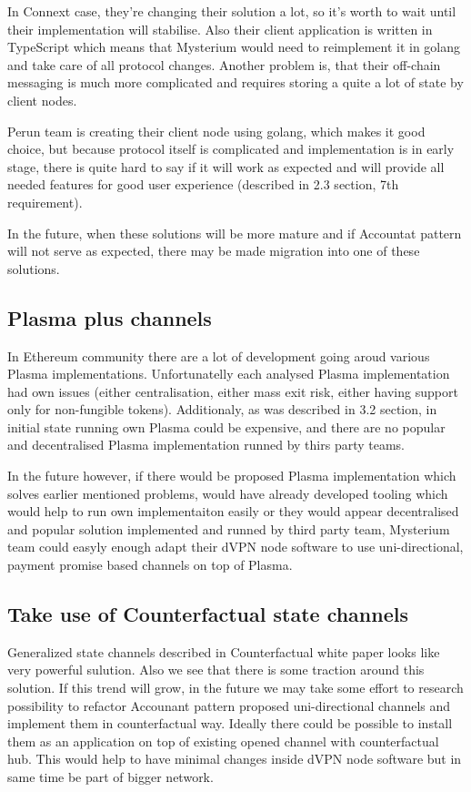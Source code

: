 \documentclass[a4paper,12pt]{article}
\begin{document}
In Connext case, they're changing their solution a lot, so it's worth to wait 
until their implementation will stabilise. Also their client application is 
written in TypeScript which means that Mysterium would need to reimplement it 
in golang and take care of all protocol changes. Another problem is, that their
off-chain messaging is much more complicated and requires storing a quite a lot
of state by client nodes.

Perun team is creating their client node using golang, which makes it good
choice, but because protocol itself is complicated and implementation is in 
early stage, there is quite hard to say if it will work as expected and will
provide all needed features for good user experience (described in 2.3 section, 
7th requirement).

In the future, when these solutions will be more mature and if Accountat pattern
will not serve as expected, there may be made migration into one of these 
solutions.

\subsection{Plasma plus channels}

In Ethereum community there are a lot of development going aroud various Plasma 
implementations. Unfortunatelly each analysed Plasma implementation had own 
issues (either centralisation, either mass exit risk, either having support only
for non-fungible tokens). Additionaly, as was described in 3.2 section, in 
initial state running own Plasma could be expensive, and there are no popular
and decentralised Plasma implementation runned by thirs party teams.

In the future however, if there would be proposed Plasma implementation which
solves earlier mentioned problems, would have already developed tooling which
would help to run own implementaiton easily or they would appear decentralised
and popular solution implemented and runned by third party team, Mysterium team 
could easyly enough adapt their dVPN node software to use uni-directional, 
payment promise based channels on top of Plasma.

\subsection{Take use of Counterfactual state channels}

Generalized state channels described in Counterfactual \cite{counterfactual} 
white paper looks like very powerful sulution. Also we see that there is some
traction around this solution. If this trend will grow, in the future we may
take some effort to research possibility to refactor Accounant pattern proposed 
uni-directional channels and implement them in counterfactual way. Ideally there
could be possible to install them as an application on top of existing opened 
channel with counterfactual hub. This would help to have minimal changes inside 
dVPN node software but in same time be part of bigger network.

\newpage
\printbibliography[heading=bibintoc]
\end{document}
